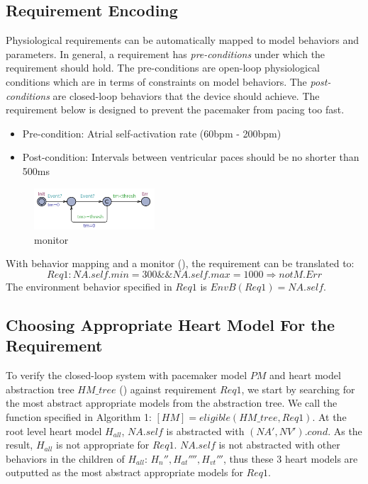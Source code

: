 \subsection{Requirement Encoding}
Physiological requirements can be automatically mapped to model behaviors and parameters. In general, a requirement has \emph{pre-conditions} under which the requirement should hold. The pre-conditions are open-loop physiological conditions which are in terms of constraints on model behaviors. The \emph{post-conditions} are closed-loop behaviors that the device should achieve. The requirement below is designed to prevent the pacemaker from pacing too fast.
\begin{itemize}
	\item Pre-condition: Atrial self-activation rate (60bpm - 200bpm)
    \item Post-condition: Intervals between ventricular paces should be no shorter than 500ms
\end{itemize}
\begin{figure}[!h]
		\centering
		\includegraphics[width=0.4\textwidth]{figs/monitor.pdf}
		\caption{\small monitor}
		\label{fig:monitor}
\end{figure}
With behavior mapping and a monitor (), the requirement can be translated to:
$$Req1: NA.self.min=300 \&\& NA.self.max=1000 \Rightarrow not M.Err$$
The environment behavior specified in $Req1$ is $EnvB(Req1)=NA.self$.
\subsection{Choosing Appropriate Heart Model For the Requirement}
To verify the closed-loop system with pacemaker model $PM$ and heart model abstraction tree $HM\_tree$ () against requirement $Req1$, we start by searching for the most abstract appropriate models from the abstraction tree. We call the function specified in Algorithm 1: $[HM]=eligible(HM\_tree,Req1)$. At the root level heart model $H_{all}$, $NA.self$ is abstracted with $(NA',NV').cond$. As the result, $H_{all}$ is not appropriate for $Req1$. $NA.self$ is not abstracted with other behaviors in the children of $H_{all}$: $H_n'',H_{at}'''',H_{vt}'''$, thus these 3 heart models are outputted as the most abstract appropriate models for $Req1$.
